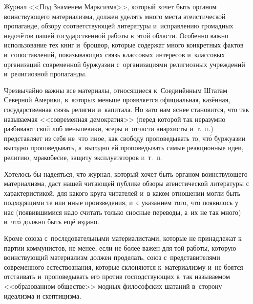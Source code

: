 Журнал <<Под Знаменем Марксизма>>, который хочет быть органом воинствующего
материализма, должен уделять много места атеистической пропаганде, обзору
соответствующей литературы и~исправлению громадных недочётов пашей
государственной работы в~этой области. Особенно важно использование тех
книг и~брошюр, которые содержат много конкретных фактов и~сопоставлений,
показывающих связь классовых интересов и~классовых организаций современной
буржуазии с~организациями религиозных учреждений и~религиозной
пропаганды.

Чрезвычайно важны все материалы, относящиеся к~Соединённым Штатам Северной
Америки, в~которых меньше проявляется официальная, казённая,
государственная связь религии и~капитала. Но зато нам яснее становится, что
так называемая <<современная демократия>> (перед которой так неразумно
разбивают свой лоб меньшевики, эсеры и~отчасти анархисты и~т.~п.)
представляет из себя не~что иное, как свободу проповедывать то, чт\'{о}
буржуазии выгодно проповедывать, а~выгодно ей проповедывать самые
реакционные идеи, религию, мракобесие, защиту эксплуататоров и~т.~п.

Хотелось бы надеяться, что журнал, который хочет быть органом воинствующего
материализма, даст нашей читающей публике обзоры атеистической литературы с
характеристикой, для какого круга читателей и~в каком отношении могли быть
подходящими те или иные произведения, и~с указанием того, чт\'{о} появилось у
нас (появившимися надо считать только сносные переводы, а~их не так много)
и~чт\'{о} должно быть ещё издано.

\sectionline

Кроме союза с~последовательными материалистами, которые не принадлежат к
партии коммунистов, не менее, если не более важен для той работы, которую
воинствующий материализм должен проделать, союз с~представителями
современного естествознания, которые склоняются к~материализму и~не боятся
отстаивать и~проповедывать его против господствующих в~так называемом
<<образованном обществе>> модных философских шатаний в~сторону идеализма и
скептицизма.

